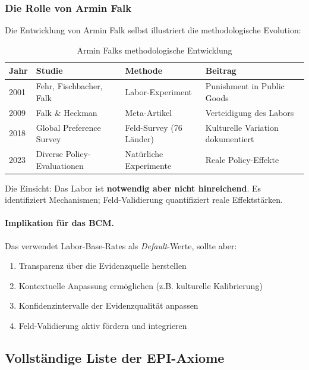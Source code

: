 \subsubsection{Die Rolle von Armin Falk}

Die Entwicklung von Armin Falk selbst illustriert die methodologische Evolution:

\begin{table}[h]
\centering
\caption{Armin Falks methodologische Entwicklung}
\begin{tabular}{@{}llll@{}}
\toprule
\textbf{Jahr} & \textbf{Studie} & \textbf{Methode} & \textbf{Beitrag} \\
\midrule
2001 & Fehr, Fischbacher, Falk & Labor-Experiment & Punishment in Public Goods \\
2009 & Falk \& Heckman & Meta-Artikel & Verteidigung des Labors \\
2018 & Global Preference Survey & Feld-Survey (76 Länder) & Kulturelle Variation dokumentiert \\
2023 & Diverse Policy-Evaluationen & Natürliche Experimente & Reale Policy-Effekte \\
\bottomrule
\end{tabular}
\end{table}

Die Einsicht: Das Labor ist \textbf{notwendig aber nicht hinreichend}. Es identifiziert Mechanismen; Feld-Validierung quantifiziert reale Effektstärken.

\paragraph{Implikation für das BCM.}
Das \BCM{} verwendet Labor-Base-Rates als \textit{Default}-Werte, sollte aber:
\begin{enumerate}
    \item Transparenz über die Evidenzquelle herstellen
    \item Kontextuelle Anpassung ermöglichen (z.B. kulturelle Kalibrierung)
    \item Konfidenzintervalle der Evidenzqualität anpassen
    \item Feld-Validierung aktiv fördern und integrieren
\end{enumerate}

\subsection{Vollständige Liste der EPI-Axiome}

